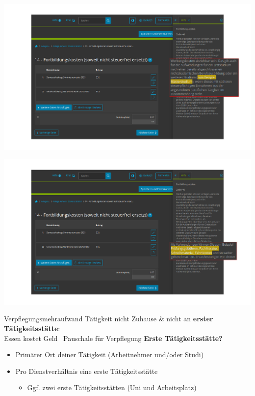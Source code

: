 \documentclass{beamer}
\begin{document}
			\begin{frame}
				\begin{center}
					\vspace{-0.6cm}
					\hspace*{-0.91cm}
					\includegraphics[scale=0.24]{images/elster-fortbildungskosten-2}
				\end{center}
			\end{frame}
			
			\begin{frame}
				\begin{center}
					\vspace{-0.6cm}
					\hspace*{-0.91cm}
					\includegraphics[scale=0.24]{images/elster-fortbildungskosten-3}
				\end{center}
			\end{frame}
		
			\begin{frame}{Verpflegungsmehraufwand}
				Tätigkeit nicht Zuhause \& nicht an \textbf{erster Tätigkeitsstätte}:\\
				Essen kostet Geld \textrightarrow\ Pauschale für Verpflegung\n
				\textbf{Erste Tätigkeitsstätte?}
				\begin{itemize}
					\item Primärer Ort deiner Tätigkeit (Arbeitnehmer und/oder Studi)
					\item Pro Dienstverhältnis eine erste Tätigkeitsstätte
					\begin{itemize}
						\item Ggf. zwei erste Tätigkeitsstätten (Uni und Arbeitsplatz)
					\end{itemize}
				\end{itemize}
			\end{frame}
				
\end{document}
